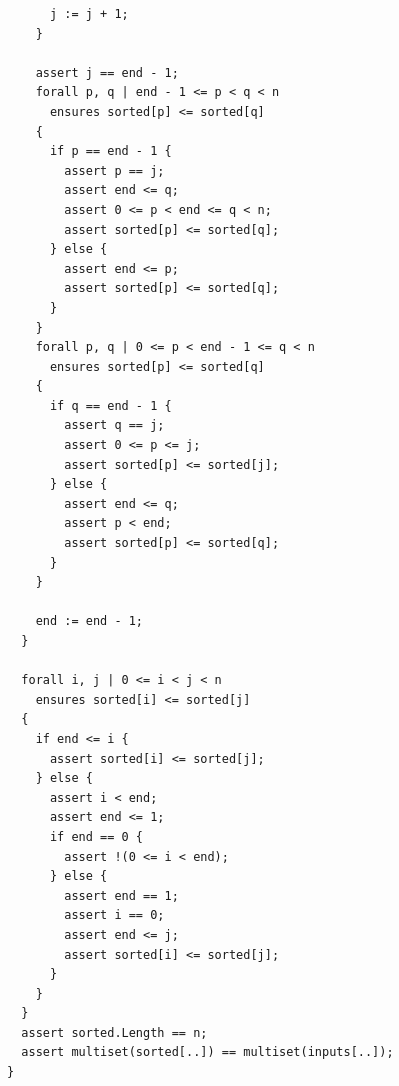 \documentclass{article}
\begin{document}
\begin{lstlisting}
      j := j + 1;
    }

    assert j == end - 1;
    forall p, q | end - 1 <= p < q < n
      ensures sorted[p] <= sorted[q]
    {
      if p == end - 1 {
        assert p == j;
        assert end <= q;
        assert 0 <= p < end <= q < n;
        assert sorted[p] <= sorted[q];
      } else {
        assert end <= p;
        assert sorted[p] <= sorted[q];
      }
    }
    forall p, q | 0 <= p < end - 1 <= q < n
      ensures sorted[p] <= sorted[q]
    {
      if q == end - 1 {
        assert q == j;
        assert 0 <= p <= j;
        assert sorted[p] <= sorted[j];
      } else {
        assert end <= q;
        assert p < end;
        assert sorted[p] <= sorted[q];
      }
    }

    end := end - 1;
  }

  forall i, j | 0 <= i < j < n
    ensures sorted[i] <= sorted[j]
  {
    if end <= i {
      assert sorted[i] <= sorted[j];
    } else {
      assert i < end;
      assert end <= 1;
      if end == 0 {
        assert !(0 <= i < end);
      } else {
        assert end == 1;
        assert i == 0;
        assert end <= j;
        assert sorted[i] <= sorted[j];
      }
    }
  }
  assert sorted.Length == n;
  assert multiset(sorted[..]) == multiset(inputs[..]);
}
\end{lstlisting}
\end{document}
